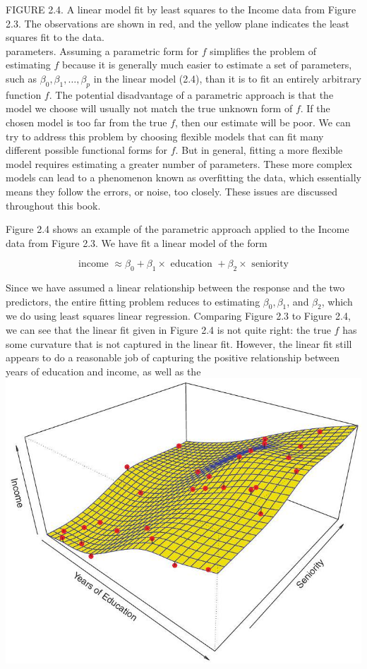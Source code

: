 \documentclass[10pt]{article}
\begin{document}
FIGURE 2.4. A linear model fit by least squares to the Income data from Figure 2.3. The observations are shown in red, and the yellow plane indicates the least squares fit to the data.\\
parameters. Assuming a parametric form for $f$ simplifies the problem of estimating $f$ because it is generally much easier to estimate a set of parameters, such as $\beta_{0}, \beta_{1}, \ldots, \beta_{p}$ in the linear model (2.4), than it is to fit an entirely arbitrary function $f$. The potential disadvantage of a parametric approach is that the model we choose will usually not match the true unknown form of $f$. If the chosen model is too far from the true $f$, then our estimate will be poor. We can try to address this problem by choosing flexible models that can fit many different possible functional forms for $f$. But in general, fitting a more flexible model requires estimating a greater number of parameters. These more complex models can lead to a phenomenon known as overfitting the data, which essentially means they follow the errors, or noise, too closely. These issues are discussed throughout this book.

Figure 2.4 shows an example of the parametric approach applied to the Income data from Figure 2.3. We have fit a linear model of the form

$$
\text { income } \approx \beta_{0}+\beta_{1} \times \text { education }+\beta_{2} \times \text { seniority }
$$

Since we have assumed a linear relationship between the response and the two predictors, the entire fitting problem reduces to estimating $\beta_{0}, \beta_{1}$, and $\beta_{2}$, which we do using least squares linear regression. Comparing Figure 2.3 to Figure 2.4, we can see that the linear fit given in Figure 2.4 is not quite right: the true $f$ has some curvature that is not captured in the linear fit. However, the linear fit still appears to do a reasonable job of capturing the positive relationship between years of education and income, as well as the\\
\includegraphics[max width=\textwidth, center]{2025_05_05_efe77898333945044de4g-038}
\end{document}
